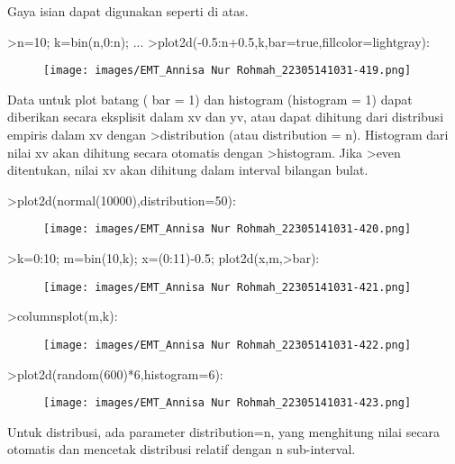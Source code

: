 \documentclass[a4paper,10pt]{article}
\begin{document}
\begin{eulernotebook}
\begin{eulercomment}
Gaya isian dapat digunakan seperti di atas.
\end{eulercomment}
\begin{eulerprompt}
>n=10; k=bin(n,0:n); ...
>plot2d(-0.5:n+0.5,k,bar=true,fillcolor=lightgray):
\end{eulerprompt}
\begin{figure}[h]
    \centering
    \texttt{[image: images/EMT\_Annisa Nur Rohmah\_22305141031-419.png]}
\end{figure}
\begin{eulercomment}
Data untuk plot batang ( bar = 1) dan histogram (histogram = 1) dapat
diberikan secara eksplisit dalam xv dan yv, atau dapat dihitung dari
distribusi empiris dalam xv dengan \textgreater{}distribution (atau distribution =
n). Histogram dari nilai xv akan dihitung secara otomatis dengan
\textgreater{}histogram. Jika \textgreater{}even ditentukan, nilai xv akan dihitung dalam
interval bilangan bulat.
\end{eulercomment}
\begin{eulerprompt}
>plot2d(normal(10000),distribution=50):
\end{eulerprompt}
\begin{figure}[h]
    \centering
    \texttt{[image: images/EMT\_Annisa Nur Rohmah\_22305141031-420.png]}
\end{figure}
\begin{eulerprompt}
>k=0:10; m=bin(10,k); x=(0:11)-0.5; plot2d(x,m,>bar):
\end{eulerprompt}
\begin{figure}[h]
    \centering
    \texttt{[image: images/EMT\_Annisa Nur Rohmah\_22305141031-421.png]}
\end{figure}
\begin{eulerprompt}
>columnsplot(m,k):
\end{eulerprompt}
\begin{figure}[h]
    \centering
    \texttt{[image: images/EMT\_Annisa Nur Rohmah\_22305141031-422.png]}
\end{figure}
\begin{eulerprompt}
>plot2d(random(600)*6,histogram=6):
\end{eulerprompt}
\begin{figure}[h]
    \centering
    \texttt{[image: images/EMT\_Annisa Nur Rohmah\_22305141031-423.png]}
\end{figure}
\begin{eulercomment}
Untuk distribusi, ada parameter distribution=n, yang menghitung nilai
secara otomatis dan mencetak distribusi relatif dengan n sub-interval.

\end{eulercomment}
\end{eulernotebook}
\end{document}
